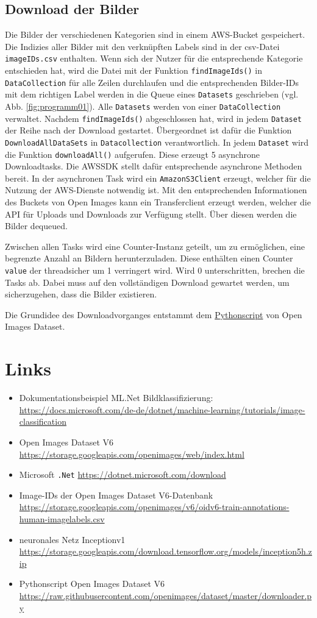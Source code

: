\documentclass[doktyp=parbeit]{TUBAFarbeiten}
\begin{document}
\subsection{Download der Bilder}
Die Bilder der verschiedenen Kategorien sind in einem AWS-Bucket gespeichert. Die Indizies aller Bilder mit den verknüpften Labels sind in der csv-Datei \texttt{imageIDs.csv} enthalten. Wenn sich der Nutzer für die entsprechende Kategorie entschieden hat, wird die Datei mit der Funktion \texttt{findImageIds()} in \texttt{DataCollection} für alle Zeilen durchlaufen und die entsprechenden Bilder-IDs mit dem richtigen Label werden in die Queue eines \texttt{Datasets} geschrieben (vgl. Abb. \ref{fig:programm01}). Alle \texttt{Datasets} werden von einer \texttt{DataCollection} verwaltet. Nachdem \texttt{findImageIds()} abgeschlossen hat, wird in jedem \texttt{Dataset} der Reihe nach der Download gestartet. Übergeordnet ist dafür die Funktion \texttt{DownloadAllDataSets} in \texttt{Datacollection} verantwortlich. In jedem \texttt{Dataset} wird die Funktion \texttt{downloadAll()} aufgerufen. Diese erzeugt 5 asynchrone Downloadtasks. Die AWSSDK stellt dafür entsprechende asynchrone Methoden bereit. In der asynchronen Task wird ein \texttt{AmazonS3Client} erzeugt, welcher für die Nutzung der AWS-Dienste notwendig ist. Mit den entsprechenden Informationen des Buckets von Open Images kann ein Transferclient erzeugt werden, welcher die API für Uploads und Downloads zur Verfügung stellt. Über diesen werden die Bilder dequeued.

Zwischen allen Tasks wird eine Counter-Instanz geteilt, um zu ermöglichen, eine begrenzte Anzahl an Bildern herunterzuladen. Diese enthälten einen Counter \texttt{value} der threadsicher um 1 verringert wird. Wird 0 unterschritten, brechen die Tasks ab. Dabei muss auf den vollständigen Download gewartet werden, um sicherzugehen, dass die Bilder existieren.

Die Grundidee des Downloadvorganges entstammt dem \href{https://raw.githubusercontent.com/openimages/dataset/master/downloader.py}{Pythonscript} von Open Images Dataset.
\section{Links}
\begin{itemize}
	\item Dokumentationsbeispiel ML.Net Bildklassifizierung: \url{https://docs.microsoft.com/de-de/dotnet/machine-learning/tutorials/image-classification}
	\item Open Images Dataset V6 \url{https://storage.googleapis.com/openimages/web/index.html}
	\item Microsoft \texttt{.Net} \url{https://dotnet.microsoft.com/download}
	\item Image-IDs der Open Images Dataset V6-Datenbank \url{https://storage.googleapis.com/openimages/v6/oidv6-train-annotations-human-imagelabels.csv}
	\item neuronales Netz Inceptionv1 \url{https://storage.googleapis.com/download.tensorflow.org/models/inception5h.zip}
	\item Pythonscript Open Images Dataset V6 \url{https://raw.githubusercontent.com/openimages/dataset/master/downloader.py}
\end{itemize}
\end{document}
